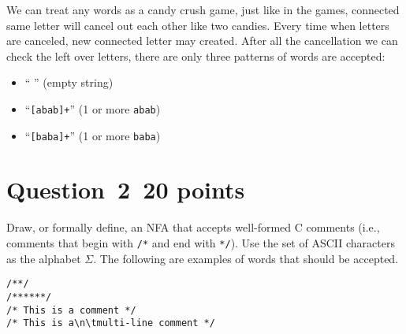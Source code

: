\documentclass[10pt]{article}
\begin{document}
\begin{framed}
We can treat any words as a candy crush game, 
just like in the games, connected same letter will cancel out each other like two candies.
Every time when letters are canceled,
new connected letter may created.
After all the cancellation we can check the left over letters,
there are only three patterns of words are accepted:
\begin{itemize}
	\item `` '' (empty string)
	\item ``{\tt [abab]+}'' (1 or more {\tt abab})
	\item ``{\tt [baba]+}'' (1 or more {\tt baba})
\end{itemize}
\end{framed}

\section*{Question~2~\hfill 20 points}

Draw, or formally define, 
an NFA that accepts well-formed C comments
(i.e., comments that begin with \verb|/*|
and end with \verb|*/|).
Use the set of ASCII characters as the alphabet $\Sigma$.
The following are examples of words that should be accepted.
\begin{verbatim}
/**/
/******/
/* This is a comment */
/* This is a\n\tmulti-line comment */
\end{verbatim}

\begin{framed}
\begin{center}
\end{center}
\end{framed}
\end{document}
